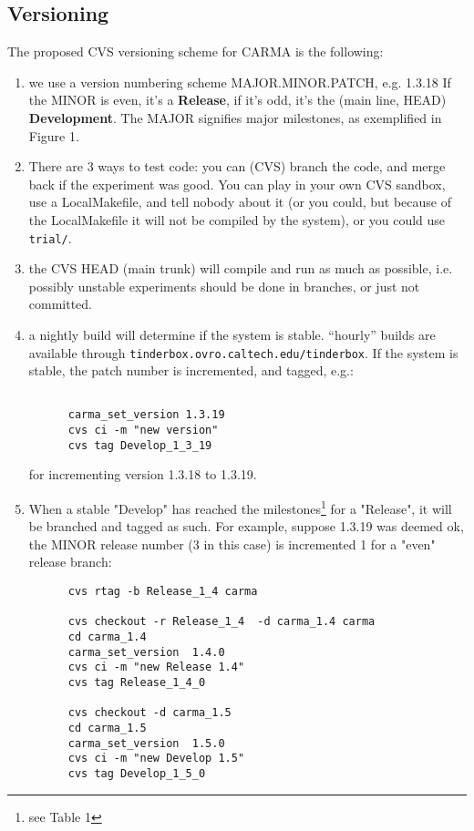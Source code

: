 \documentclass{article}
\begin{document}
\subsection{Versioning}

The proposed CVS versioning scheme for CARMA is the following:

\begin{enumerate}
\item
we use a version numbering scheme MAJOR.MINOR.PATCH, e.g. 1.3.18
If the MINOR is even, it's a {\bf Release}, if it's odd, it's the 
(main line, HEAD) {\bf Development}. 
The MAJOR signifies major milestones, as exemplified in
Figure 1.
\item
There are 3 ways to test code: you can (CVS) branch the code, and merge
back if the experiment was good. You can play in your own CVS sandbox,
use a LocalMakefile, and tell nobody about it (or you could, but because
of the LocalMakefile it will not be compiled by the system), or you
could use {\tt trial/}.
\item
the CVS HEAD (main trunk) will compile and run as much as possible, 
i.e. possibly unstable experiments should be done in branches,
or just not committed.
\item
a nightly build will determine if the system is stable. ``hourly''
builds are available through {\tt tinderbox.ovro.caltech.edu/tinderbox}.
If the system is stable, the patch number is incremented, and
tagged, e.g.:
\footnotesize
\begin{verbatim}

      carma_set_version 1.3.19
      cvs ci -m "new version" 
      cvs tag Develop_1_3_19
\end{verbatim}
\normalsize

   for incrementing version 1.3.18 to 1.3.19.

\item
When a stable "Develop" has reached the milestones\footnote{see Table 1}
for a "Release",
it will be branched and tagged as such. For example, suppose
1.3.19 was deemed ok, the MINOR release number (3 in this case)
is incremented 1 for a "even" release branch:

\footnotesize
\begin{verbatim}
      cvs rtag -b Release_1_4 carma

      cvs checkout -r Release_1_4  -d carma_1.4 carma
      cd carma_1.4
      carma_set_version  1.4.0
      cvs ci -m "new Release 1.4" 
      cvs tag Release_1_4_0

      cvs checkout -d carma_1.5
      cd carma_1.5
      carma_set_version  1.5.0
      cvs ci -m "new Develop 1.5" 
      cvs tag Develop_1_5_0
\end{verbatim}
\normalsize            %


\end{enumerate}
\end{document}
